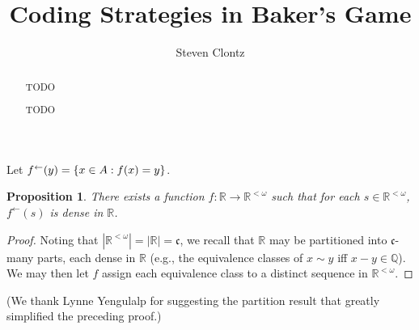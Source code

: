\documentclass{amsart}
\theoremstyle{plain}
\newtheorem{proposition}[theorem]{Proposition}
\theoremstyle{definition}
\theoremstyle{remark}
\theoremstyle{plain}
\theoremstyle{definition}
\theoremstyle{remark}
\begin{document}
\title{Coding Strategies in Baker's Game}



\author{Steven Clontz}
\address{Department of Mathematics and Statistics,
The University of South Alabama,
Mobile, AL 36688}







\begin{abstract}
TODO
\end{abstract}


\maketitle




\begin{abstract}
TODO
\end{abstract}


\maketitle



Let \(f^\leftarrow(y)=\left\{x\in A:f(x)=y\right\}\).

\begin{proposition}\label{denseThreads}
There exists a function \(f:\mathbb R\to\mathbb R^{<\omega}\) such that
for each \(s\in\mathbb R^{<\omega}\), \(f^\leftarrow(s)\) is dense in \(\mathbb R\).
\end{proposition}

\begin{proof}
Noting that \(|\mathbb R^{<\omega}|=|\mathbb R|=\mathfrak c\), we recall that
\(\mathbb R\) may be partitioned into \(\mathfrak c\)-many parts, each dense in
\(\mathbb R\) (e.g., the equivalence classes of \(x\sim y\) iff \(x-y\in\mathbb Q\)).
We may then let \(f\) assign each equivalence class to a distinct sequence in
\(\mathbb R^{<\omega}\).
\end{proof}

(We thank Lynne Yengulalp for
suggesting the partition result that greatly simplified the preceding proof.)
\end{document}
